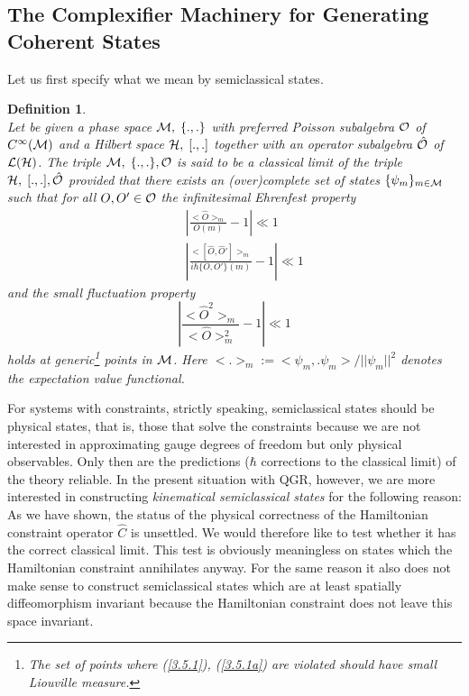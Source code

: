 \documentclass[12pt]{report}
\newtheorem{Definition}{Definition}[section]
\def\be{\begin{equation}}
\def\ee{\end{equation}}
\def\ba{\begin{eqnarray}}
\def\ea{\end{eqnarray}}
\begin{document}
\subsection{The Complexifier Machinery for Generating Coherent States}
\label{s3.5.1}

Let us first specify what we mean by semiclassical states.
%
\begin{Definition} \label{def3.5.1} ~~~~\\
Let be given a phase space ${\cal M},\;\{.,.\}$ with preferred Poisson 
subalgebra $\cal O$ of $C^\infty({\cal M})$ and a Hilbert space 
${\cal H},\;[.,.]$ together with an operator subalgebra $\hat{{\cal O}}$
of ${\cal L}({\cal H})$.
The triple ${\cal M},\;\{.,.\},{\cal O}$ is said to be a classical 
limit of the triple ${\cal H},\;[.,.],\hat{{\cal O}}$ provided that there
exists an (over)complete set of states $\{\psi_m\}_{m\in {\cal M}}$
such that for all $O,O'\in {\cal O}$ the 
{\it infinitesimal Ehrenfest property}
\ba \label{3.5.1}
&& 
|\frac{<\hat{O}>_m}{O(m)}-1|\ll 1 
\nonumber\\
&& 
|\frac{<[\hat{O},\hat{O}']>_m} {i\hbar\{O,O'\}(m)}-1|\ll 1 
\ea
and the {\it small fluctuation property}
\be \label{3.5.1a}
|\frac{<\hat{O}^2>_m}{<\hat{O}>_m^2}-1|\ll 1 
\ee
holds at generic\footnote{The set of points where (\ref{3.5.1}), 
(\ref{3.5.1a}) are 
violated should have small Liouville measure.} points in $\cal M$.
Here $<.>_m:=<\psi_m,.\psi_m>/||\psi_m||^2$ denotes the expectation value 
functional.
\end{Definition}
%
For systems with constraints, strictly speaking, semiclassical states 
should be physical states, that 
is, those that solve the constraints because we are not interested in 
approximating gauge degrees of freedom but only physical observables.
Only then are the predictions ($\hbar$ corrections to the classical
limit) of the theory reliable. In the present situation with QGR, however,
we are more interested in constructing {\it kinematical semiclassical
states} for the following reason: As we have shown, the status of the 
physical correctness of the Hamiltonian constraint operator $\hat{C}$
is unsettled. We would therefore like to test whether it has the correct
classical limit. This test is obviously meaningless on states which
the Hamiltonian constraint annihilates anyway. For the same reason it also 
does not make sense to construct semiclassical states which are 
at least spatially diffeomorphism invariant because the Hamiltonian 
constraint does not leave this space invariant.
\end{document}
